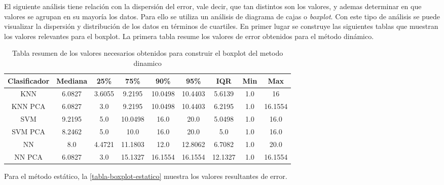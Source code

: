 El siguiente análisis tiene relación con la dispersión del error, vale decir, que tan distintos son los valores, y ademas determinar en que valores se agrupan en su mayoría los datos. Para ello se utiliza un análisis de diagrama de cajas o \textit{boxplot}. Con este tipo de análisis se puede visualizar la dispersión y distribución de los datos en términos de cuartiles. En primer lugar se construye las siguientes tablas que muestran los valores relevantes para el boxplot. La primera tabla resume los valores de error obtenidos para el método dinámico.

\begin{table}[!h]
\centering
\caption{Tabla resumen de los valores necesarios obtenidos para construir el boxplot del metodo dinamico}
\label{tabla-boxplot-dinamico}
\begin{tabular}{|c|c|c|c|c|c|c|c|c|}
\hline
\textbf{Clasificador} & \textbf{Mediana} & \textbf{25\%} & \textbf{75\%} & \textbf{90\%} & \textbf{95\%} & \textbf{IQR} & \textbf{Min} & \textbf{Max} \\ \hline
KNN                   & 6.0827           & 3.6055        & 9.2195        & 10.0498       & 10.4403       & 5.6139       & 1.0            & 16           \\ \hline
KNN PCA               & 6.0827           & 3.0           & 9.2195        & 10.0498       & 10.4403       & 6.2195       & 1.0          & 16.1554      \\ \hline
SVM                   & 9.2195           & 5.0           & 10.0498       & 16.0          & 20.0          & 5.0498       & 1.0          & 16.0         \\ \hline
SVM PCA               & 8.2462           & 5.0           & 10.0          & 16.0          & 20.0          & 5.0          & 1.0          & 16.0         \\ \hline
NN                    & 8.0              & 4.4721        & 11.1803       & 12.0          & 12.8062       & 6.7082       & 1.0          & 20.0         \\ \hline
NN PCA                & 6.0827           & 3.0           & 15.1327       & 16.1554       & 16.1554       & 12.1327      & 1.0          & 16.1554      \\ \hline
\end{tabular}
\end{table}


Para el método estático, la \autoref{tabla-boxplot-estatico} muestra los valores resultantes de error.

